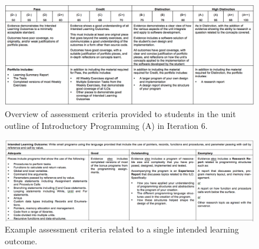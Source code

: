 \begin{figure}[p]
	\centering
	\includegraphics[width=\textwidth]{AssessmentCriteria}
	\caption{Overview of assessment criteria provided to students in the unit outline of Introductory Programming (A) in Iteration 6.}
	\label{fig:i6_assessment_criteria}
\end{figure}

\begin{figure}[p]
	\centering
	\includegraphics[width=1\textwidth]{AssessmentCriteriaDetail}
	\caption{Example assessment criteria related to a single intended learning outcome.}
	\label{fig:i6_assessment_criteria_detail}
\end{figure}

